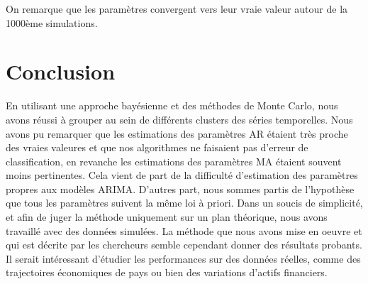 On remarque que les paramètres convergent vers leur vraie valeur autour de la 1000ème simulations.

\section{Conclusion}
En utilisant une approche bayésienne et des méthodes de Monte Carlo, nous avons réussi à grouper au sein de différents clusters des séries temporelles. Nous avons pu remarquer que les estimations des paramètres AR étaient très proche des vraies valeures et que nos algorithmes ne faisaient pas d'erreur de classification, en revanche les estimations des paramètres MA étaient souvent moins pertinentes. Cela vient de part de la difficulté d'estimation des paramètres propres aux modèles ARIMA. D'autres part, nous sommes partis de l'hypothèse que tous les paramètres suivent la même loi à priori.
\newline 
Dans un soucis de simplicité, et afin de juger la méthode uniquement sur un plan théorique, nous avons travaillé avec des données simulées. La méthode que nous avons mise en oeuvre et qui est décrite par les chercheurs semble cependant donner des résultats probants. Il serait intéressant d'étudier les performances sur des données réelles, comme des trajectoires économiques de pays ou bien des variations d'actifs financiers. 



